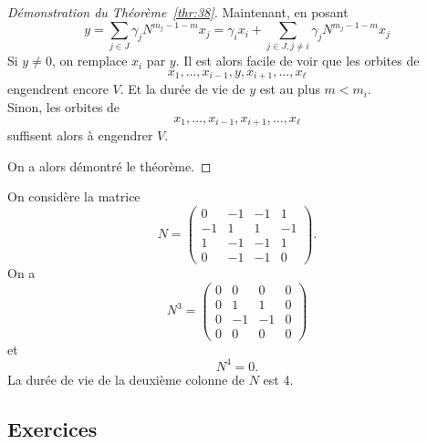 \begin{proof}[Démonstration du Théorème~\ref{thr:38}]
Maintenant, en posant $$y = \sum_{j \in J} γ_j N^{m_j-1 - m}x_j = γ_i x_i + \sum_{j \in J, j \neq i} γ_j N^{m_j-1 - m}x_j$$ 
Si $y \neq 0$, on remplace $x_i$ par $y$.
Il est alors facile de voir que les orbites de 
\begin{displaymath}
  x_1,\dots, x_{i-1},y,x_{i+1},\dots,x_\ell
\end{displaymath}
engendrent encore $V$. Et la durée de vie de $y$ est au plus $m<m_i$. \\
Sinon, les orbites de
\begin{displaymath}
  x_1,\dots, x_{i-1},x_{i+1},\dots,x_\ell
\end{displaymath}
suffisent alors à engendrer $V$.

On a alors démontré le théorème.  
\end{proof}


\begin{example}
  \label{exe:57}

  On considère la matrice
  \begin{displaymath}
    N =  \left(\begin{array}{rrrr}
0 & -1 & -1 & 1 \\
-1 & 1 & 1 & -1 \\
1 & -1 & -1 & 1 \\
0 & -1 & -1 & 0
\end{array}\right).  
\end{displaymath}
On a
\begin{displaymath}
  N^3 = \left(\begin{array}{rrrr}
0 & 0 & 0 & 0 \\
0 & 1 & 1 & 0 \\
0 & -1 & -1 & 0 \\
0 & 0 & 0 & 0
\end{array}\right) 
\end{displaymath}
et
\begin{displaymath}
  N^4 = 0. 
\end{displaymath}
La durée de vie de la deuxième colonne de  $N$ est 4. 
\end{example}



\subsection*{Exercices} 


